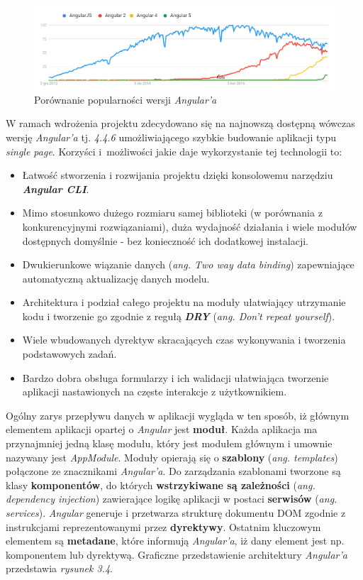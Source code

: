 \begin{figure}[ht]
	\centering
	\includegraphics[width=1\linewidth]{graphics/chapter-3/angular-frameworks.png}
	\caption{Porównanie popularności wersji \textit{Angular'a} \cite{google-trends}}
	\label{fig:angular-version-comparison}
\end{figure}

\noindent W ramach wdrożenia projektu zdecydowano się na najnowszą dostępną wówczas wersję \textit{Angular'a} tj. \textit{4.4.6} umożliwiającego szybkie budowanie aplikacji typu \textit{single page}. Korzyści i~możliwości jakie daje wykorzystanie tej technologii to:
\begin{itemize}
    \item Łatwość stworzenia i rozwijania projektu dzięki konsolowemu narzędziu \textbf{\textit{Angular CLI}}.
    \item Mimo stosunkowo dużego rozmiaru samej biblioteki (w porównania z konkurencyjnymi rozwiązaniami), duża wydajność działania i wiele modułów dostępnych domyślnie - bez konieczność ich dodatkowej instalacji.
    \item Dwukierunkowe wiązanie danych (\textit{ang. Two way data binding}) zapewniające automatyczną aktualizację danych modelu.
    \item Architektura i podział całego projektu na moduły ułatwiający utrzymanie kodu i tworzenie go zgodnie z regułą \textbf{\textit{DRY}} (\textit{ang. Don't repeat yourself}).
    \item Wiele wbudowanych dyrektyw skracających czas wykonywania i tworzenia podstawowych zadań.
    \item Bardzo dobra obsługa formularzy i ich walidacji ułatwiająca tworzenie aplikacji nastawionych na częste interakcje z użytkownikiem.
\end{itemize}
Ogólny zarys przepływu danych w aplikacji wygląda w ten sposób, iż głównym elementem aplikacji opartej o \textit{Angular} jest \textbf{moduł}. Każda aplikacja ma przynajmniej jedną klasę modułu, który jest modułem głównym i umownie nazywany jest \textit{AppModule}. Moduły opierają się o \textbf{szablony} (\textit{ang. templates}) połączone ze znacznikami \textit{Angular'a}. Do zarządzania szablonami tworzone są klasy \textbf{komponentów}, do których \textbf{wstrzykiwane są zależności} (\textit{ang. dependency injection}) zawierające logikę aplikacji w postaci \textbf{serwisów} (\textit{ang. services}). \textit{Angular} generuje i przetwarza strukturę dokumentu DOM zgodnie z instrukcjami reprezentowanymi przez \textbf{dyrektywy}.  Ostatnim kluczowym elementem są \textbf{metadane}, które informują \textit{Angular'a}, iż dany element jest np. komponentem lub dyrektywą. Graficzne przedstawienie architektury \textit{Angular'a} przedstawia \textit{rysunek 3.4}.

